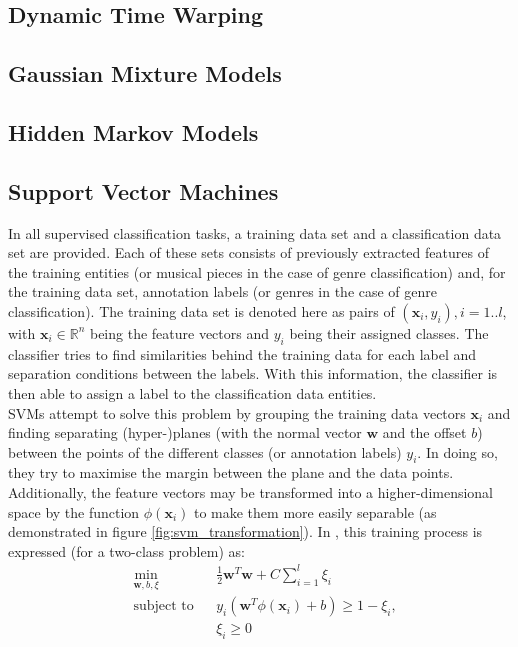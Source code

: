 \subsection{Dynamic Time Warping}
\subsection{Gaussian Mixture Models}
\subsection{Hidden Markov Models}

\subsection{Support Vector Machines}
In all supervised classification tasks, a training data set and a classification data set are provided. Each of these sets consists of previously extracted features of the training entities (or musical pieces in the case of genre classification) and, for the training data set, annotation labels (or genres in the case of genre classification). The training data set is denoted here as pairs of $\left(\mathbf{x}_{i}, y_{i}\right), i=1..l$, with $\textbf{x}_i \in \mathbb{R}^{n}$ being the feature vectors and $y_{i}$ being their assigned classes. The classifier tries to find similarities behind the training data for each label and separation conditions between the labels. With this information, the classifier is then able to assign a label to the classification data entities.\\
SVMs attempt to solve this problem by grouping the training data vectors $\mathbf{x}_{i}$ and finding separating (hyper-)planes (with the normal vector $\mathbf{w}$ and the offset $b$) between the points of the different classes (or annotation labels) $y_{i}$. In doing so, they try to maximise the margin between the plane and the data points. Additionally, the feature vectors may be transformed into a higher-dimensional space by the function $\phi(\textbf{x}_i)$ to make them more easily separable (as demonstrated in figure \ref{fig:svm_transformation}).\newpage
In \cite{techreport:practical_svm}, this training process is expressed (for a two-class problem) as:
\begin{equation*}
\begin{aligned}
& \min\limits_{\mathbf{w},b,\xi} & & \frac{1}{2}\mathbf{w}^{T}\mathbf{w} + C \sum\limits_{i=1}^{l}\xi_{i} \\
& \text{subject to} & & y_{i}(\mathbf{w}^{T} \phi(\mathbf{x}_{i})+b) \geq 1-\xi_{i} , \\
&&& \xi_{i} \geq 0
\end{aligned}
\end{equation*}
